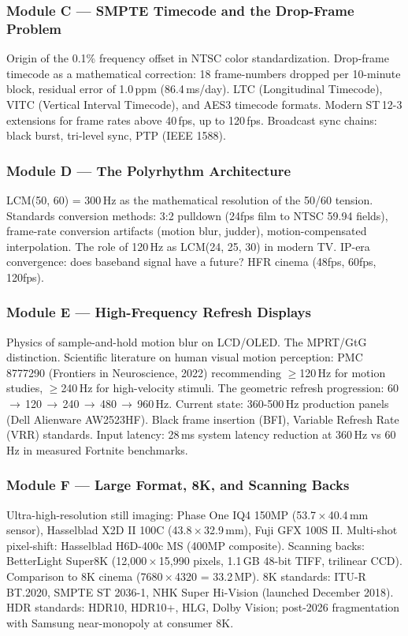 \documentclass[11pt,letterpaper]{article}
\begin{document}
\subsubsection{Module C --- SMPTE Timecode and the Drop-Frame Problem}
Origin of the 0.1\% frequency offset in NTSC color standardization. Drop-frame timecode as a
mathematical correction: 18 frame-numbers dropped per 10-minute block, residual error of 1.0\,ppm
(86.4\,ms/day). LTC (Longitudinal Timecode), VITC (Vertical Interval Timecode), and AES3 timecode
formats. Modern ST\,12-3 extensions for frame rates above 40\,fps, up to 120\,fps. Broadcast sync
chains: black burst, tri-level sync, PTP (IEEE 1588).

\subsubsection{Module D --- The Polyrhythm Architecture}
LCM(50, 60) = 300\,Hz as the mathematical resolution of the 50/60 tension. Standards conversion
methods: 3:2 pulldown (24fps film to NTSC 59.94 fields), frame-rate conversion artifacts (motion blur,
judder), motion-compensated interpolation. The role of 120\,Hz as LCM(24, 25, 30) in modern TV.
IP-era convergence: does baseband signal have a future? HFR cinema (48fps, 60fps, 120fps).

\subsubsection{Module E --- High-Frequency Refresh Displays}
Physics of sample-and-hold motion blur on LCD/OLED. The MPRT/GtG distinction. Scientific literature
on human visual motion perception: PMC 8777290 (Frontiers in Neuroscience, 2022) recommending
$\geq$120\,Hz for motion studies, $\geq$240\,Hz for high-velocity stimuli. The geometric refresh
progression: 60\,$\rightarrow$\,120\,$\rightarrow$\,240\,$\rightarrow$\,480\,$\rightarrow$\,960\,Hz.
Current state: 360-500\,Hz production panels (Dell Alienware AW2523HF). Black frame insertion (BFI),
Variable Refresh Rate (VRR) standards. Input latency: 28\,ms system latency reduction at 360\,Hz vs
60\,Hz in measured Fortnite benchmarks.

\subsubsection{Module F --- Large Format, 8K, and Scanning Backs}
Ultra-high-resolution still imaging: Phase One IQ4 150MP (53.7\,$\times$\,40.4\,mm sensor),
Hasselblad X2D II 100C (43.8\,$\times$\,32.9\,mm), Fuji GFX 100S II. Multi-shot pixel-shift:
Hasselblad H6D-400c MS (400MP composite). Scanning backs: BetterLight Super8K (12,000\,$\times$\,15,990
pixels, 1.1\,GB 48-bit TIFF, trilinear CCD). Comparison to 8K cinema (7680\,$\times$\,4320 = 33.2\,MP).
8K standards: ITU-R BT.2020, SMPTE ST 2036-1, NHK Super Hi-Vision (launched December 2018). HDR
standards: HDR10, HDR10+, HLG, Dolby Vision; post-2026 fragmentation with Samsung near-monopoly
at consumer 8K.
\end{document}
